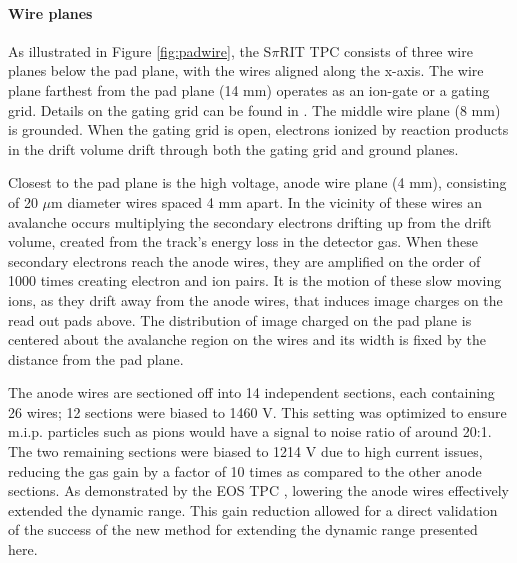 \documentclass[review]{elsarticle}
\begin{document}
\paragraph{Wire planes}
As illustrated in Figure \ref{fig:padwire}, the S$\pi$RIT TPC consists of three wire planes below the pad plane, with the wires aligned along the x-axis. The wire plane farthest from the pad plane (14 mm) operates as an ion-gate or a gating grid. Details on the gating grid can be found in \cite{suwat}. The middle wire plane (8 mm) is grounded. When the gating grid is open, electrons ionized by reaction products in the drift volume drift through both the gating grid and ground planes. 

Closest to the pad plane is the high voltage, anode wire plane (4 mm), consisting of 20 $\mu$m diameter wires spaced 4 mm apart. In the vicinity of these wires an avalanche occurs multiplying the secondary electrons drifting up from the drift volume, created from the track's energy loss in the detector gas. When these secondary electrons reach the anode wires, they are amplified on the order of 1000 times creating electron and ion pairs. It is the motion of these slow moving ions, as they drift away from the anode wires, that induces image charges on the read out pads above. The distribution of image charged on the pad plane is centered about the avalanche region on the wires and its width is fixed by the distance from the pad plane. 

The anode wires are sectioned off into 14 independent sections, each containing 26 wires; 12 sections were biased to 1460 V. This setting was optimized to ensure m.i.p. particles such as pions would have a signal to noise ratio of around 20:1. The two remaining sections were biased to 1214 V due to high current issues, reducing the gas gain by a factor of 10 times as compared to the other anode sections. As demonstrated by the EOS TPC \citep{eos}, lowering the anode wires effectively extended the dynamic range.  This gain reduction allowed for a direct validation of the success of the new method for extending the dynamic range presented here. 
\end{document}
